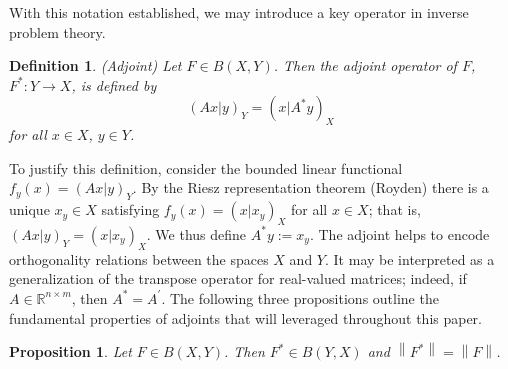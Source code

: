 \documentclass[12pt]{article}
\newcommand*{\norm}[1]{\left\lVert#1\right\rVert}
\newtheorem*{definition}{Definition}
\newtheorem*{prop}{Proposition}
\begin{document}
 With this notation established, we may introduce a key operator in inverse problem theory. 
 \begin{definition} 
 (Adjoint) Let $F \in B(X, Y)$. Then the adjoint operator of $F$, $F^*: Y \to X$, is defined by 
 	\begin{equation*} 
	(Ax|y)_Y = (x|A^*y)_X
 	\end{equation*} 
	for all $x \in X$, $y \in Y$. 
 \end{definition} 
To justify this definition, consider the bounded linear functional $f_y(x) = (Ax|y)_Y$. By the Riesz representation theorem (Royden) 
there is a unique $x_y \in X$ satisfying $f_y(x) = (x|x_y)_X$ for all $x \in X$; that is, $(Ax|y)_Y = (x|x_y)_X$. 
We thus define $A^*y := x_y$. The adjoint helps to encode orthogonality relations between the spaces $X$ and $Y$. 
It may be interpreted as a generalization of the transpose operator for real-valued matrices; indeed, if $A \in \mathbb{R}^{n \times m}$, 
then $A^* = A^\prime$. The following three propositions outline the fundamental properties of adjoints that will leveraged throughout
this paper. 

\begin{prop} 
Let $F \in B(X, Y)$. Then $F^* \in B(Y, X)$ and $\norm{F^*} = \norm{F}$. 
\end{prop}
\end{document}
